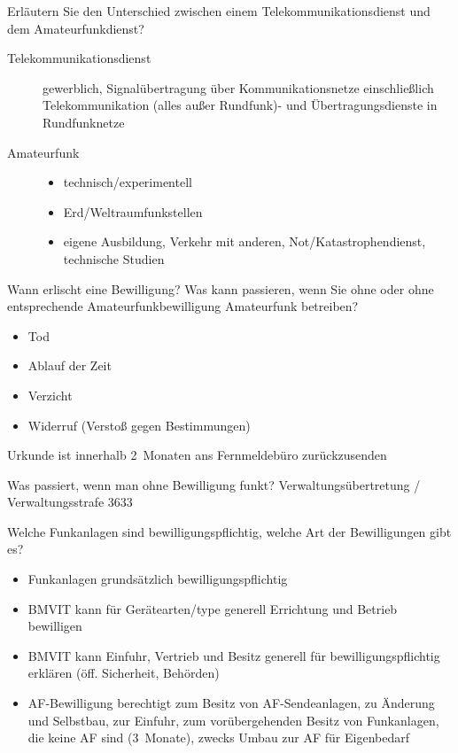 \documentclass[avery5371,grid,frame,a4paper]{flashcards}
\newcommand{\card}[3]{
  \begin{flashcard}[{\chap} -- #1]{#2}#3\end{flashcard}
}
\begin{document}
\card{08}{Erläutern Sie den Unterschied zwischen einem Telekommunikationsdienst und dem Amateurfunkdienst?}{
  \begin{description}
    \item[Telekommunikationsdienst]
      gewerblich, Signalübertragung über Kommunikationsnetze einschließlich Telekommunikation
      (alles außer Rundfunk)- und Übertragungsdienste in Rundfunknetze
    \item[Amateurfunk]
      \begin{itemize}
        \item technisch/experimentell
        \item Erd/Weltraumfunkstellen
        \item eigene Ausbildung, Verkehr mit anderen, Not/Katastrophendienst, technische Studien
      \end{itemize}
  \end{description}
}

\card{09}{Wann erlischt eine Bewilligung? Was kann passieren, wenn Sie ohne oder ohne entsprechende Amateurfunkbewilligung Amateurfunk betreiben?}{
  \begin{itemize}
    \item Tod
    \item Ablauf der Zeit
    \item Verzicht
    \item Widerruf (Verstoß gegen Bestimmungen)
  \end{itemize}
  Urkunde ist innerhalb 2~Monaten ans Fernmeldebüro zurückzusenden
}

\card{10}{Was passiert, wenn man ohne Bewilligung funkt?}{
  Verwaltungsübertretung / Verwaltungsstrafe
  \SI{3633}{\EUR}
}

\card{11}{Welche Funkanlagen sind bewilligungspflichtig, welche Art der Bewilligungen gibt es?}{
  \small
  \begin{itemize}
    \item Funkanlagen grundsätzlich bewilligungspflichtig
    \item BMVIT kann für Gerätearten/type generell Errichtung und Betrieb bewilligen
    \item BMVIT kann Einfuhr, Vertrieb und Besitz generell für bewilligungspflichtig erklären (öff. Sicherheit, Behörden)
    \item AF-Bewilligung berechtigt zum Besitz von AF-Sendeanlagen, zu Änderung und Selbstbau, zur Einfuhr, zum vorübergehenden Besitz von Funkanlagen, die keine AF sind (3~Monate), zwecks Umbau zur AF für Eigenbedarf
  \end{itemize}
}
\end{document}
